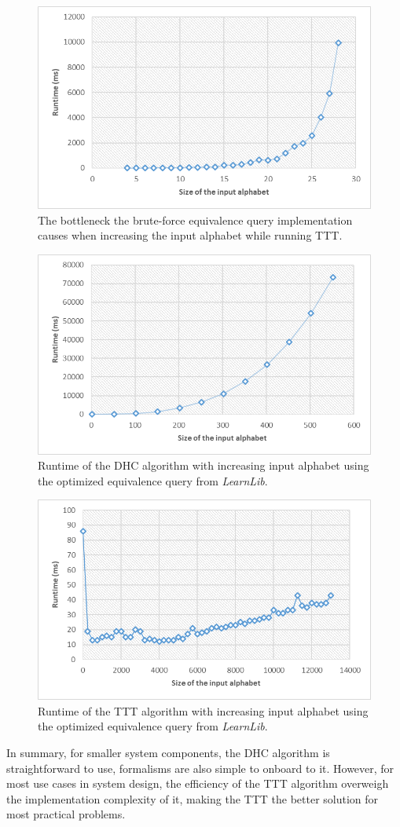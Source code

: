 \begin{figure}
	\centering
	\includegraphics[width=0.7\linewidth]{figures/inputruntimettt}
	\caption{The bottleneck the brute-force equivalence query implementation causes when increasing the input alphabet while running TTT.}
	\label{fig:inputruntimettt}
\end{figure}

\begin{figure}
	\centering
	\includegraphics[width=0.7\linewidth]{figures/inputruntimeopt}
	\caption{Runtime of the DHC algorithm with increasing input alphabet using the optimized equivalence query from \emph{LearnLib}.}
	\label{fig:inputruntimeopt}
\end{figure}


\begin{figure}[H]
	\centering
	\includegraphics[width=0.7\linewidth]{figures/inputruntimeoptttt}
	\caption{Runtime of the TTT algorithm with increasing input alphabet using the optimized equivalence query from \emph{LearnLib}.}
	\label{fig:inputruntimeoptttt}
\end{figure}

In summary, for smaller system components, the DHC algorithm is straightforward to use, formalisms are also simple to onboard to it. However, for most use cases in system design, the efficiency of the TTT algorithm overweigh the implementation complexity of it, making the TTT the better solution for most practical problems.

